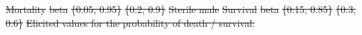 \documentclass[]{bmcart}
\providecommand{\DIFdeltex}[1]{{\protect\color{red}\sout{#1}}}                      %
\providecommand{\DIFdelFL}[1]{\DIFdel{#1}} %
\providecommand{\DIFdel}[1]{\texorpdfstring{\DIFdeltex{#1}}{}} %
\begin{document}
\begin{backmatter}
\DIFdelFL{Mortality }%
\DIFdelFL{beta }%
\DIFdelFL{\{0.05, 0.95\} }%
\DIFdelFL{\{0.2, 0.9\}}%
\DIFdelFL{Sterile male }%
\DIFdelFL{Survival }%
\DIFdelFL{beta }%
\DIFdelFL{\{0.15, 0.85\} }%
\DIFdelFL{\{0.3, 0.6\}}%
{%
\DIFdelFL{Elicited values for the probability of death / survival. }}


\end{backmatter}
\end{document}
